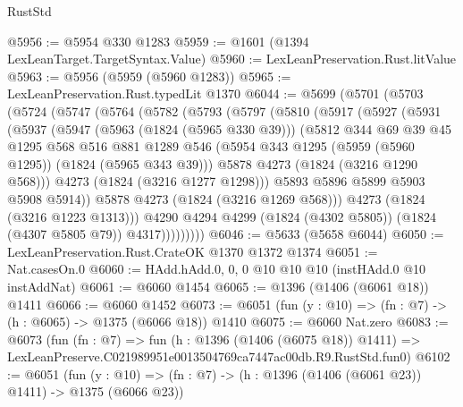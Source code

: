 \begin{lexlean}{RustStd}
\begin{coremodule}
@5956 := @5954 @330 @1283
@5959 := @1601 (@1394 LexLeanTarget.TargetSyntax.Value)
@5960 := LexLeanPreservation.Rust.litValue
@5963 := @5956 (@5959 (@5960 @1283))
@5965 := LexLeanPreservation.Rust.typedLit @1370
@6044 := @5699
    (@5701
      (@5703
        (@5724
          (@5747
            (@5764
              (@5782
                (@5793
                  (@5797
                    (@5810
                      (@5917
                        (@5927
                          (@5931
                            (@5937
                              (@5947
                                (@5963 (@1824 (@5965 @330 @39)))
                                (@5812
                                  @344
                                  @69
                                  @39
                                  @45
                                  @1295
                                  @568
                                  @516
                                  @881
                                  @1289
                                  @546
                                  (@5954 @343 @1295 (@5959 (@5960 @1295)) (@1824 (@5965 @343 @39)))
                                  @5878
                                  @4273
                                  (@1824 (@3216 @1290 @568)))
                                @4273
                                (@1824 (@3216 @1277 @1298)))
                              @5893
                              @5896
                              @5899
                              @5903
                              @5908
                              @5914))
                          @5878
                          @4273
                          (@1824 (@3216 @1269 @568)))
                        @4273
                        (@1824 (@3216 @1223 @1313)))
                      @4290
                      @4294
                      @4299
                      (@1824 (@4302 @5805))
                      (@1824 (@4307 @5805 @79))
                      @4317)))))))))
@6046 := @5633 (@5658 @6044)
@6050 := LexLeanPreservation.Rust.CrateOK @1370 @1372 @1374
@6051 := Nat.casesOn.{0}
@6060 := HAdd.hAdd.{0, 0, 0} @10 @10 @10 (instHAdd.{0} @10 instAddNat)
@6061 := @6060 @1454
@6065 := @1396 (@1406 (@6061 @18)) @1411
@6066 := @6060 @1452
@6073 := @6051 (fun (y : @10) => (fn : @7) -> (h : @6065) -> @1375 (@6066 @18)) @1410
@6075 := @6060 Nat.zero
@6083 := @6073
    (fun (fn : @7) =>
    fun (h : @1396 (@1406 (@6075 @18)) @1411) =>
    LexLeanPreserve.C021989951e0013504769ca7447ac00db.R9.RustStd.fun0)
@6102 := @6051
    (fun (y : @10) => (fn : @7) -> (h : @1396 (@1406 (@6061 @23)) @1411) -> @1375 (@6066 @23))

\end{coremodule}
\end{lexlean}
